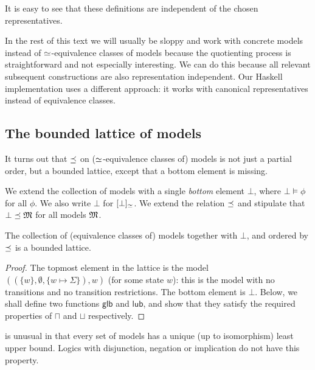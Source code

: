 \NI It is easy to see that these definitions are independent of the
chosen representatives.

In the rest of this text we will usually be sloppy and work with
concrete models instead of $\simeq$-equivalence classes of models
because the quotienting process is straightforward and not especially
interesting. We can do this because all relevant subsequent
constructions are also representation independent.  Our Haskell
implementation \cite{HaskellImplementation} uses a different approach:
it works with canonical representatives instead of equivalence
classes.

\subsection{The bounded lattice of models}
\label{boundedlattice}
It turns out that $\preceq $ on ($\simeq$-equivalence classes of)
models is not just a partial order, but a bounded lattice, except
that a bottom element is missing.

\begin{definition}
We extend the collection of models with a single \emph{bottom} element
$\bot$, where $\bot \models \phi$ for all $\phi$. We also write $\bot$
for $[\bot]_{\simeq}$.  We extend the relation $\preceq $ and
stipulate that $\bot \preceq \frak{M}$ for all models $\frak{M}$.
\end{definition}

\begin{theorem}
The collection of (equivalence classes of) models together with
$\bot$, and ordered by $\preceq$ is a bounded lattice.
\end{theorem}
\begin{proof}
The topmost element in the lattice is the model $( (\{w\}, \emptyset,
\{w \mapsto \Sigma\}), w)$ (for some state $w$): this is the model
with no transitions and no transition restrictions.  The bottom
element is $\bot$.  Below, we shall define two functions $\mathsf{glb}$ and $\mathsf{lub}$, and show that they satisfy the required properties of $\sqcap$ and $\sqcup$ respectively.
\end{proof}

\Cathoristic{} is unusual in that every set of models has a unique (up to
isomorphism) least upper bound. Logics with disjunction, negation or implication do
not have this property.  

